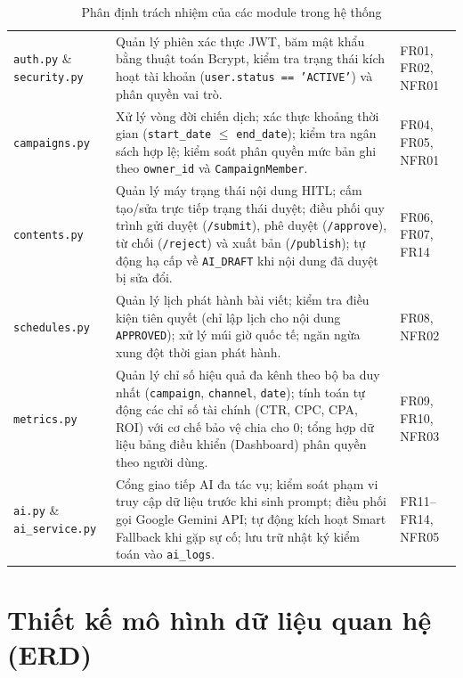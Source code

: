 \begin{table}[H]
\centering
\small
\caption{Phân định trách nhiệm của các module trong hệ thống}
\label{tab:v9-components}
\begin{tabularx}{\textwidth}{|L{3.2cm}|Y|L{2.8cm}|}
\hline
{} &  & \\
\hline
\texttt{auth.py} \& \texttt{security.py} & Quản lý phiên xác thực JWT, băm mật khẩu bằng thuật toán Bcrypt, kiểm tra trạng thái kích hoạt tài khoản (\texttt{user.status == 'ACTIVE'}) và phân quyền vai trò. & FR01, FR02, NFR01\\
\hline
\texttt{campaigns.py} & Xử lý vòng đời chiến dịch; xác thực khoảng thời gian (\texttt{start\_date} $\le$ \texttt{end\_date}); kiểm tra ngân sách hợp lệ; kiểm soát phân quyền mức bản ghi theo \texttt{owner\_id} và \texttt{CampaignMember}. & FR04, FR05, NFR01\\
\hline
\texttt{contents.py} & Quản lý máy trạng thái nội dung HITL; cấm tạo/sửa trực tiếp trạng thái duyệt; điều phối quy trình gửi duyệt (\texttt{/submit}), phê duyệt (\texttt{/approve}), từ chối (\texttt{/reject}) và xuất bản (\texttt{/publish}); tự động hạ cấp về \texttt{AI\_DRAFT} khi nội dung đã duyệt bị sửa đổi. & FR06, FR07, FR14\\
\hline
\texttt{schedules.py} & Quản lý lịch phát hành bài viết; kiểm tra điều kiện tiên quyết (chỉ lập lịch cho nội dung \texttt{APPROVED}); xử lý múi giờ quốc tế; ngăn ngừa xung đột thời gian phát hành. & FR08, NFR02\\
\hline
\texttt{metrics.py} & Quản lý chỉ số hiệu quả đa kênh theo bộ ba duy nhất (\texttt{campaign}, \texttt{channel}, \texttt{date}); tính toán tự động các chỉ số tài chính (CTR, CPC, CPA, ROI) với cơ chế bảo vệ chia cho 0; tổng hợp dữ liệu bảng điều khiển (Dashboard) phân quyền theo người dùng. & FR09, FR10, NFR03\\
\hline
\texttt{ai.py} \& \texttt{ai\_service.py} & Cổng giao tiếp AI đa tác vụ; kiểm soát phạm vi truy cập dữ liệu trước khi sinh prompt; điều phối gọi Google Gemini API; tự động kích hoạt Smart Fallback khi gặp sự cố; lưu trữ nhật ký kiểm toán vào \texttt{ai\_logs}. & FR11--FR14, NFR05\\
\hline
\end{tabularx}
\end{table}

\section{Thiết kế mô hình dữ liệu quan hệ (ERD)}

